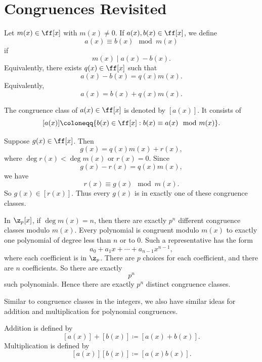
\section{Congruences Revisited}

\begin{definition}[Congruences]
    Let $m(x)\in\ff[x]$ with $m(x)\neq 0$.
    If $a(x),b(x)\in\ff[x]$, we define
    \[
        a(x)\equiv b(x)\mod m(x)
    \]
    if
    \[
        m(x)\mid a(x)-b(x).
    \]
    Equivalently, there exists $q(x)\in\ff[x]$ such that
    \[
        a(x)-b(x)=q(x)m(x).
    \]
    Equivalently,
    \[
        a(x)=b(x)+q(x)m(x).
    \]
\end{definition}

\begin{definition}
    The congruence class of $a(x)\in\ff[x]$ is denoted by $[a(x)]$.
    It consists of
    \[
        [a(x)] \coloneqq \{b(x)\in\ff[x] : b(x)\equiv a(x)\mod m(x)\}.
    \]
\end{definition}

\begin{definition}
    Suppose $g(x)\in\ff[x]$.
    Then
    \[
        g(x)=q(x)m(x)+r(x),
    \]
    where $\deg r(x)<\deg m(x)$ or $r(x)=0$.
    Since
    \[
        g(x)-r(x)=q(x)m(x),
    \]
    we have
    \[
        r(x)\equiv g(x)\mod m(x).
    \]
    So $g(x)\in [r(x)]$.
    Thus every $g(x)$ is in exactly one of these congruence classes.
\end{definition}

\begin{lemma}{
    In $\z_p[x]$, if $\deg m(x)=n$, then there are exactly $p^n$ different congruence classes modulo $m(x)$.
}
    Every polynomial is congruent modulo $m(x)$ to exactly one polynomial of degree less than $n$ or to $0$.
    Such a representative has the form
    \[
        a_0+a_{1}x+\cdots+a_{n-1}x^{n-1},
    \]
    where each coefficient is in $\z_p$.
    There are $p$ choices for each coefficient, and there are $n$ coefficients.
    So there are exactly
    \[
        p^n
    \]
    such polynomials.
    Hence there are exactly $p^n$ distinct congruence classes.
\end{lemma}

Similar to congruence classes in the integers, we also have similar ideas for addition and multiplication for polynomial congruences.

\begin{definition}
    Addition is defined by
    \[
        [a(x)]+[b(x)]\coloneqq [a(x)+b(x)].
    \]
    Multiplication is defined by
    \[
        [a(x)][b(x)]\coloneqq [a(x)b(x)].
    \]
\end{definition}

